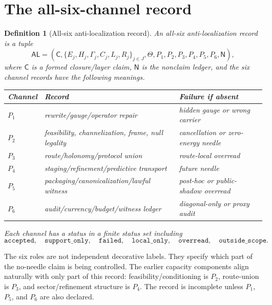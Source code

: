 \documentclass[11pt]{article}
\newtheorem{definition}{Definition}
\newcommand{\ThetaB}{\Theta}
\newcommand{\AL}{\mathsf{AL}}
\begin{document}
\section{The all-six-channel record}
\begin{definition}[All-six anti-localization record]
An all-six anti-localization record is a tuple
\[
  \AL=(\mathsf C,\{E_j,H_j,\Gamma_j,C_j,L_j,R_j\}_{j\in J},\ThetaB,
       P_1,P_2,P_3,P_4,P_5,P_6,\mathsf N),
\]
where $\mathsf C$ is a formed closure/layer claim, $\mathsf N$ is the nonclaim ledger, and the six channel records have the following meanings.

\begin{center}
\begin{tabular}{lll}
\toprule
Channel & Record & Failure if absent\\
\midrule
$P_1$ & rewrite/gauge/operator repair & hidden gauge or wrong carrier\\
$P_2$ & feasibility, channelization, frame, null legality & cancellation or zero-energy needle\\
$P_3$ & route/holonomy/protocol union & route-local overread\\
$P_4$ & staging/refinement/predictive transport & future needle\\
$P_5$ & packaging/canonicalization/lawful witness & post-hoc or public-shadow overread\\
$P_6$ & audit/currency/budget/witness ledger & diagonal-only or proxy audit\\
\bottomrule
\end{tabular}
\end{center}
Each channel has a status in a finite status set including
\[
  \texttt{accepted},\quad \texttt{support\_only},\quad \texttt{failed},\quad
  \texttt{local\_only},\quad \texttt{overread},\quad \texttt{outside\_scope}.
\]
\end{definition}

The six roles are not independent decorative labels.  They specify which part of the no-needle claim is being controlled.  The earlier capacity components align naturally with only part of this record: feasibility/conditioning is $P_2$, route-union is $P_3$, and sector/refinement structure is $P_4$.  The record is incomplete unless $P_1$, $P_5$, and $P_6$ are also declared.
\end{document}
